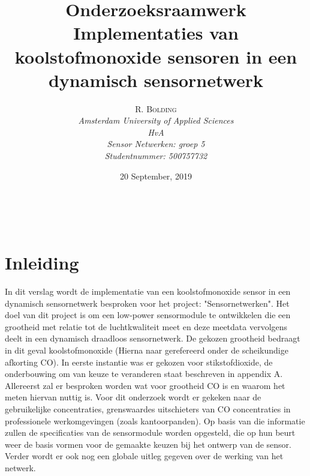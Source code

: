 \documentclass[a4paper, 11pt]{article} %
\title{\textbf{Onderzoeksraamwerk}\\ %
	Implementaties van koolstofmonoxide sensoren in een dynamisch sensornetwerk} %
\author{\textsc{R. Bolding} %
	\\{\textit{Amsterdam University of Applied Sciences\\ 
			HvA\\
			Sensor Netwerken: groep 5\\
			Studentnummer: 500757732}}} %
\date{20 September, 2019} %
\makeatletter
\renewcommand{\maketitle}{ %
	\begin{flushright} %
		{\LARGE\@title} %
		
		\vspace{50pt} %
		
		{\large\@author} %
		\\\@date %
		
		\vspace{40pt} %
	\end{flushright}
}
\makeatother
\begin{document}
	\captionsetup{justification=centering}
	\renewcommand{\contentsname}{Inhoudsopgave}
	\def\textsubscript#1{\ensuremath{_{\mbox{\textscale{.6}{#1}}}}}
	\hypersetup{hidelinks=true}
	\maketitle %
	
	
	
	
	\vspace{10pt} %
	
	\newpage
	\tableofcontents
	\newpage
	\section{Inleiding} \label{sec::Inleiding}
	In dit verslag wordt de implementatie van een koolstofmonoxide sensor in een dynamisch sensornetwerk besproken voor het project: "Sensornetwerken". Het doel van dit project is om een low-power sensormodule te ontwikkelen die een grootheid met relatie tot de luchtkwaliteit meet en deze meetdata vervolgens deelt in een dynamisch draadloos sensornetwerk. De gekozen grootheid bedraagt in dit geval koolstofmonoxide (Hierna naar gerefereerd onder de scheikundige afkorting CO). In eerste instantie was er gekozen voor stikstofdioxide, de onderbouwing om van keuze te veranderen staat beschreven in appendix A. Allereerst zal er besproken worden wat voor grootheid CO is en waarom het meten hiervan nuttig is. Voor dit onderzoek wordt er gekeken naar de gebruikelijke concentraties, grenswaardes uitschieters van CO concentraties in professionele werkomgevingen (zoals kantoorpanden). Op basis van die informatie zullen de specificaties van de sensormodule worden opgesteld, die op hun beurt weer de basis vormen voor de gemaakte keuzen bij het ontwerp van de sensor. Verder wordt er ook nog een globale uitleg gegeven over de werking van het netwerk.
	
\end{document}
